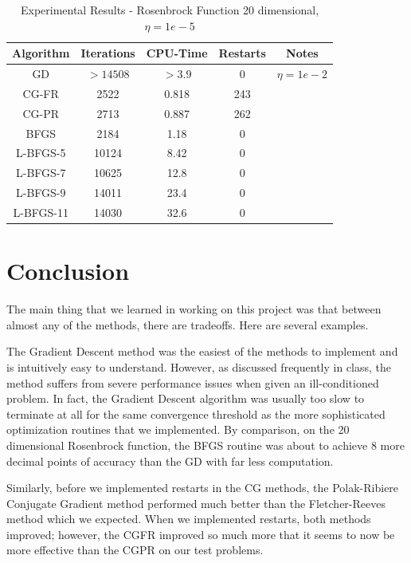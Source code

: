 \documentclass[12pt]{amsart}
\begin{document}
\begin{table}
\caption{Experimental Results - Rosenbrock Function 20 dimensional, $\eta=1e-5$}
\label{results_rosenbrock_20}
\begin{center}
\begin{tabular}{|c||c||c||c||c|}
\hline
Algorithm & Iterations & CPU-Time & Restarts & Notes\\
\hline
GD & $>14508$ & $>3.9$ & 0 & $\eta=1e-2$\\
\hline
CG-FR & 2522 & 0.818 & 243 & \\
\hline
CG-PR & 2713 & 0.887 & 262 & \\
\hline
BFGS & 2184 & 1.18 & 0 & \\
\hline
L-BFGS-5 & 10124 & 8.42 & 0 &\\
\hline
L-BFGS-7 & 10625 & 12.8 & 0 &\\
\hline
L-BFGS-9 & 14011 & 23.4 & 0 &\\
\hline
L-BFGS-11 & 14030 & 32.6 & 0 &\\
\hline
\end{tabular}
\end{center}
\end{table}


\section{Conclusion}
The main thing that we learned in working on this project was that between almost any of the methods, there are tradeoffs.  Here are several examples.

The Gradient Descent method was the easiest of the methods to implement and is intuitively easy to understand. However, as discussed frequently in class, the method suffers from severe performance issues when given an ill-conditioned problem.  In fact, the Gradient Descent algorithm was usually too slow to terminate at all for the same convergence threshold as the more sophisticated optimization routines that we implemented.  By comparison, on the 20 dimensional Rosenbrock function, the BFGS routine was about to achieve 8 more decimal points of accuracy than the GD with far less computation.

Similarly, before we implemented restarts in the CG methods, the Polak-Ribiere Conjugate Gradient method performed much better than the Fletcher-Reeves method which we expected. When we implemented restarts, both methods improved; however, the CGFR improved so much more that it seems to now be more effective than the CGPR on our test problems.
\end{document}
